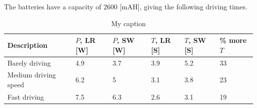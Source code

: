 The batteries have a capacity of $2600$ [mAH], giving the following driving times.

\begin{table}[H]
\centering
\caption{My caption}
\label{my-label}
\begin{tabular}{|l|l|p{2cm}|p{2cm}|p{2cm}|p{2cm}|}
\hline
\textbf{Description} & $P$, LR {[}W{]} & $P$, SW {[}W{]} & $T$, LR [S]& $T$, SW [S] & \% more $T$ \\ \hline
Barely driving       & 4.9                         & 3.7                               & 3.9              & 5.2                      & 33                 \\ \hline
Medium driving speed & 6.2                         & 5                                 & 3.1              & 3.8                      & 23                 \\ \hline
Fast driving         & 7.5                         & 6.3                               & 2.6              & 3.1                      & 19                 \\ \hline
\end{tabular}
\end{table}

